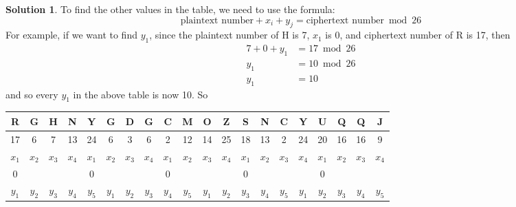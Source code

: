 \documentclass[11pt]{article}
\theoremstyle{definition}\newtheorem{definition}{Definition}
\theoremstyle{definition}\newtheorem{question}{Question}
\theoremstyle{definition}\newtheorem*{solution}{Solution}
\begin{document}
\begin{solution}
    To find the other values in the table, we need to use the formula:
    \begin{equation*}
        \text{plaintext number} + x_i + y_j = \text{ciphertext number} \bmod {26} \tag{*}
    \end{equation*}
    For example, if we want to find $y_1$, since the plaintext number of H is 7, $x_1$ is 0, and ciphertext number of R is 17, then
    \begin{align*}
        7 + 0 + y_1 &= 17 \bmod {26} \\
        y_1 &= 10 \bmod {26} \\
        y_1 &= 10
    \end{align*}
    and so every $y_1$ in the above table is now 10. So
    \begin{center}
        \begin{tabular}{|cccccccccccccccccccc|}
            \hline
            R     & G     & H     & N                          & \multicolumn{1}{c|}{Y}     & G     & D     & G                          & C     & \multicolumn{1}{c|}{M}     & O     & Z                          & S     & N     & \multicolumn{1}{c|}{C}     & Y                          & U     & Q     & Q     & J     \\ \hline
            17    & 6     & 7     & 13                         & 24                         & 6     & 3     & 6                          & 2     & 12                         & 14    & 25                         & 18    & 13    & 2                          & 24                         & 20    & 16    & 16    & 9     \\ \hline
            $x_1$ & $x_2$ & $x_3$ & \multicolumn{1}{c|}{$x_4$} & $x_1$                      & $x_2$ & $x_3$ & \multicolumn{1}{c|}{$x_4$} & $x_1$ & $x_2$                      & $x_3$ & \multicolumn{1}{c|}{$x_4$} & $x_1$ & $x_2$ & $x_3$                      & \multicolumn{1}{c|}{$x_4$} & $x_1$ & $x_2$ & $x_3$ & $x_4$ \\ \hline
            0     &       &       & \multicolumn{1}{c|}{}      & 0                          &       &       & \multicolumn{1}{c|}{}      & 0     &                            &       & \multicolumn{1}{c|}{}      & 0     &       &                            & \multicolumn{1}{c|}{}      & 0     &       &       &       \\ \hline
            $y_1$ & $y_2$ & $y_3$ & $y_4$                      & \multicolumn{1}{c|}{$y_5$} & $y_1$ & $y_2$ & $y_3$                      & $y_4$ & \multicolumn{1}{c|}{$y_5$} & $y_1$ & $y_2$                      & $y_3$ & $y_4$ & \multicolumn{1}{c|}{$y_5$} & $y_1$                      & $y_2$ & $y_3$ & $y_4$ & $y_5$ \\ \hline

\end{tabular}
\end{center}
\end{solution}
\end{document}
